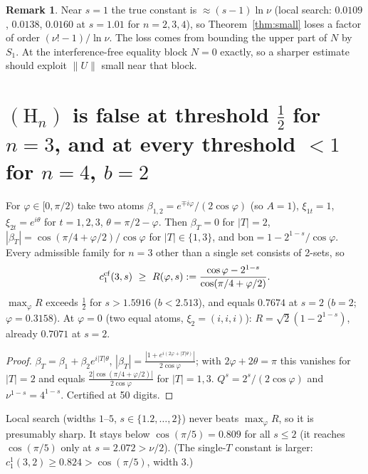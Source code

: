 \documentclass[11pt]{article}
\theoremstyle{definition}\newtheorem{definition}[theorem]{Definition}\newtheorem{remark}[theorem]{Remark}
\begin{document}
\begin{remark}\label{rem:crude}
Near $s=1$ the true constant is $\approx(s-1)\ln\nu$ (local search: $0.0109$, $0.0138$, $0.0160$ at $s=1.01$ for $n=2,3,4$), so
Theorem~\ref{thm:small} loses a factor of order $(\nu!-1)/\ln\nu$.  The loss comes from bounding the upper part of $N$ by $S_1$.
At the interference-free equality block $N=0$ exactly, so a sharper estimate should exploit $\|U\|$ small near that block.
\end{remark}

\section{$(\mathrm H_n)$ is false at threshold $\frac12$ for $n=3$, and at every threshold $<1$ for $n=4$, $b=2$}
\begin{proposition}[$n=3$, closed form]\label{prop:n3}
For $\varphi\in[0,\pi/2)$ take two atoms $\beta_{1,2}=e^{\mp i\varphi}/(2\cos\varphi)$ (so $A=1$), $\xi_{1t}=1$, $\xi_{2t}=e^{i\theta}$ for $t=1,2,3$,
$\theta=\pi/2-\varphi$.  Then $\beta_T=0$ for $|T|=2$, $|\beta_T|=\cos(\pi/4+\varphi/2)/\cos\varphi$ for $|T|\in\{1,3\}$, and
$\mathrm{bon}=1-2^{1-s}/\cos\varphi$.  Every admissible family for $n=3$ other than a single set consists of 2-sets, so
\[c_1^{\rm cf}(3,s)\ \ge\ R(\varphi,s):=\frac{\cos\varphi-2^{1-s}}{\cos(\pi/4+\varphi/2)} .\]
$\max_\varphi R$ exceeds $\frac12$ for $s>1.5916$ ($b<2.513$), and equals $0.7674$ at $s=2$ ($b=2$; $\varphi=0.3158$).  At $\varphi=0$
(two equal atoms, $\xi_2=(i,i,i)$): $R=\sqrt2(1-2^{1-s})$, already $0.7071$ at $s=2$.
\end{proposition}
\begin{proof}
$\beta_T=\beta_1+\beta_2e^{i|T|\theta}$, $|\beta_T|=\frac{|1+e^{i(2\varphi+|T|\theta)}|}{2\cos\varphi}$; with $2\varphi+2\theta=\pi$ this vanishes for
$|T|=2$ and equals $\frac{2|\cos(\pi/4+\varphi/2)|}{2\cos\varphi}$ for $|T|=1,3$.  $Q^s=2^s/(2\cos\varphi)$ and $\nu^{1-s}=4^{1-s}$.  Certified at 50 digits.
\end{proof}
Local search (widths $1$--$5$, $s\in\{1.2,\dots,2\}$) never beats $\max_\varphi R$, so it is presumably sharp.  It stays below
$\cos(\pi/5)=0.809$ for all $s\le2$ (it reaches $\cos(\pi/5)$ only at $s=2.072>\nu/2$).  (The single-$T$ constant is larger:
$c_1^1(3,2)\ge0.824>\cos(\pi/5)$, width 3.)
\end{document}
